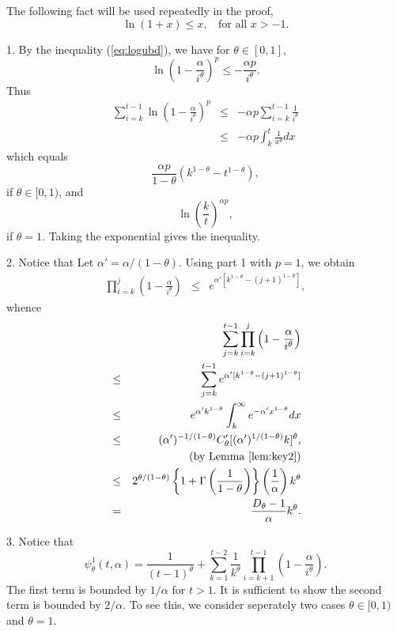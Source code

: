 \documentclass[twoside,twocolumn,journal]{IEEEtran}
\newenvironment{pf}[1][Proof]{\medskip\noindent\hspace{1em}{\itshape #1: }}{\hspace*{\fill}~\QED\par\endtrivlist\medskip}
\begin{document}
\begin{pf}
The following fact will be used repeatedly in the proof,
\begin{equation}\label{eq:logubd}
\ln (1+x) \leq x, \ \ \ \ \mbox{for all $x>-1$}.
\end{equation}

1. By the inequality (\ref{eq:logubd}), we have for $\theta \in [0,1]$,
\[ \ln \left(1 - \frac{\alpha}{i^\theta}\right)^p \leq -\frac{\alpha p}{i^\theta}. \]
Thus
\begin{eqnarray*}
\sum_{i=k}^{t-1} \ln \left( 1-\frac{\alpha}{i^\theta} \right)^p & \leq & - \alpha p \sum_{i=k}^{t-1} \frac{1}{i^\theta} \\
 & \leq & -\alpha p\int_{k}^{t} \frac{1}{x^\theta} d x
\end{eqnarray*}
which equals
\[\frac{\alpha p}{1-\theta} \left(k^{1-\theta}-t^{1-\theta} \right), \]
if $\theta\in [0,1)$, and
\[ \ln \left(\frac{k}{t}\right)^{\alpha p}, \]
if $\theta=1$. Taking the exponential gives the inequality.

2. Notice that
Let $\alpha'=\alpha/(1-\theta)$. Using part 1 with $p=1$, we obtain
\begin{eqnarray*}
\prod_{i=k}^j \left(1 - \frac{\alpha}{i^\theta} \right) & \leq &  e^{\alpha'[k^{1-\theta} - (j+1)^{1-\theta}]},
\end{eqnarray*}
whence
\begin{eqnarray*}
& & \sum_{j=k}^{t-1} \prod_{i=k}^j \left(1 - \frac{\alpha}{i^\theta} \right) \\
& \leq & \sum_{j=k}^{t-1} e^{\alpha'[k^{1-\theta} - (j+1)^{1-\theta}]} \\
& \leq & e^{\alpha' k^{1-\theta}}\int_{k}^\infty e^{- \alpha' x^{1-\theta}} d x \\
& \leq & (\alpha')^{-1/(1-\theta)} C_\theta' [(\alpha')^{1/(1-\theta)} k]^{\theta}, \\
& & \ \ \ \ \ \mbox{(by Lemma \ref{lem:key2})} \\
& \leq & 2^{\theta/(1-\theta)} \left\{ 1+\Gamma\left(\frac{1}{1-\theta}\right)\right\} \left(\frac{1}{\alpha}\right)k^\theta \\
& = & \frac{D_\theta-1}{\alpha} k^\theta.
\end{eqnarray*}

3. Notice that
\[ \psi^1_\theta(t,\alpha)= \frac{1}{(t-1)^\theta} + \sum_{k=1}^{t-2} \frac{1}{k^\theta}\prod_{i=k+1}^{t-1} \left(1-\frac{\alpha}{i^\theta}\right). \]
The first term is bounded by $1/\alpha$ for $t>1$. It is sufficient to show the second term is bounded by $2/\alpha$. To see this, we consider seperately
two cases $\theta\in [0,1)$ and $\theta=1$.


\end{pf}
\end{document}
